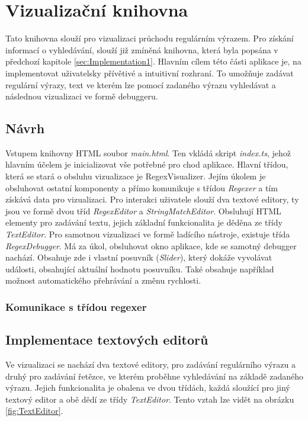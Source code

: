 \chapter{Vizualizační knihovna}\label{sec:Implementation2}

Tato knihovna slouží pro vizualizaci průchodu regulárním výrazem.
Pro získání informací o vyhledávání, slouží již zmíněná knihovna, která byla popsána v předchozí kapitole \ref{sec:Implementation1}.
Hlavním cílem této části aplikace je, na implementovat uživatelsky přívětivé a intuitivní rozhraní.
To umožňuje zadávat regulární výrazy, text ve kterém lze pomocí zadaného výrazu vyhledávat a následnou vizualizaci ve formě debuggeru.


\section{Návrh}

Vstupem knihovny HTML soubor \textit{main.html}.
Ten vkládá skript \textit{index.ts}, jehož hlavním účelem je inicializovat vše potřebné pro chod aplikace.
Hlavní třídou, která se stará o obsluhu vizualizace je RegexVisualizer. 
Jejím úkolem je obsluhovat ostatní komponenty a přímo komunikuje s třídou \textit{Regexer} a tím získává data pro vizualizaci.
Pro interakci uživatele slouží dva textové editory, ty jsou ve formě dvou tříd \textit{RegexEditor} a \textit{StringMatchEditor}.
Obsluhují HTML elementy pro zadávání textu, jejich základní funkcionalita je děděna ze třídy \textit{TextEditor}.
Pro samotnou vizualizaci ve formě ladícího nástroje, existuje třída \textit{RegexDebugger}.
Má za úkol, obsluhovat okno aplikace, kde se samotný debugger nachází.
Obsahuje zde i vlastní posuvník (\textit{Slider}), který dokáže vyvolávat události, obsahující aktuální hodnotu posuvníku.
Také obsahuje například možnost automatického přehrávání a změnu rychlosti.


\subsection*{Komunikace s třídou regexer}


\section{Implementace textových editorů}

Ve vizualizaci se nachází dva textové editory, pro zadávání regulárního výrazu a druhý pro zadávání řetězce, ve kterém proběhne vyhledávání na základě zadaného výrazu.
Jejich funkcionalita je obalena ve dvou třídách, každá sloužící pro jiný textový editor a obě dědí ze třídy \textit{TextEditor}.
Tento vztah lze vidět na obrázku \ref{fig:TextEditor}.

